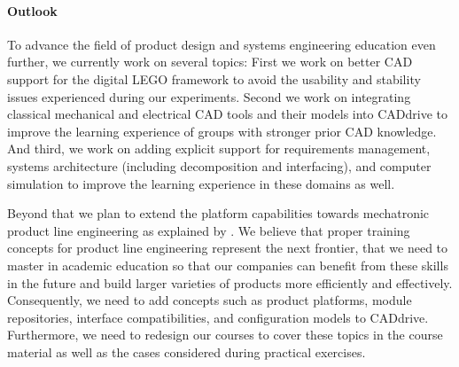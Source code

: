 \documentclass{PDS}
\begin{document}
\paragraph{Outlook}

To advance the field of product design and systems engineering education even further, we currently work on several topics:
First we work on better CAD support for the digital LEGO framework to avoid the usability and stability issues experienced during our experiments.
Second we work on integrating classical mechanical and electrical CAD tools and their models into CADdrive to improve the learning experience of groups with stronger prior CAD knowledge.
And third, we work on adding explicit support for requirements management, systems architecture (including decomposition and interfacing), and computer simulation to improve the learning experience in these domains as well.

Beyond that we plan to extend the platform capabilities towards mechatronic product line engineering as explained by \cite{Michalek_2011}.
We believe that proper training concepts for product line engineering represent the next frontier, that we need to master in academic education so that our companies can benefit from these skills in the future and build larger varieties of products more efficiently and effectively.
Consequently, we need to add concepts such as product platforms, module repositories, interface compatibilities, and configuration models to CADdrive.
Furthermore, we need to redesign our courses to cover these topics in the course material as well as the cases considered during practical exercises.

\begin{Backmatter}




\end{Backmatter}
\end{document}
